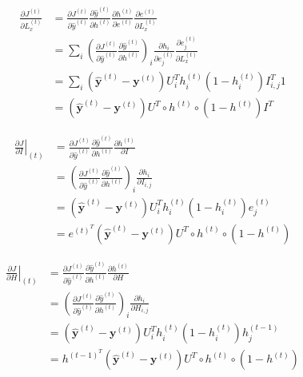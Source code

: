 \documentclass[10pt]{article}
\begin{document}
\begin{enumerate}[label=(\alph*)]
\begin{equation}
\begin{aligned}
	\frac{\partial J^{(t)}}{\partial L_x^{(t)}} & = \frac{\partial J^{(t)}}{\partial \hat{y}^{(t)}}
	\frac{\partial \hat{y}^{(t)}}{\partial h^{(t)}}\frac{\partial h^{(t)}}{\partial e^{(t)}}\frac{\partial e^{(t)}}{\partial L_x^{(t)}}\\
	& = \sum_i(\frac{\partial J^{(t)}}{\partial \hat{y}^{(t)}}\frac{\partial \hat{y}^{(t)}}{\partial h^{(t)}})_i
	\frac{\partial h_i}{\partial e^{(t)}_j}\frac{\partial e^{(t)}_j}{\partial L_x^{(t)}}\\
	& = \sum_i (\hat{\mathbf{y}}^{(t)} - \mathbf{y}^{(t)})U^{T}_ih^{(t)}_i(1-h^{(t)}_i)I^{T}_{i,j}1\\
	& = (\hat{\mathbf{y}}^{(t)} - \mathbf{y}^{(t)})U^{T}\circ h^{(t)}\circ(1-h^{(t)})I^{T}
\end{aligned}
\end{equation}

\begin{equation}
\begin{aligned}
	\left.\frac{\partial J}{\partial I}\right|_{(t)} & = \frac{\partial J^{(t)}}{\partial \hat{y}^{(t)}}
	\frac{\partial \hat{y}^{(t)}}{\partial h^{(t)}}\frac{\partial h^{(t)}}{\partial I}\\
	& = (\frac{\partial J^{(t)}}{\partial \hat{y}^{(t)}}\frac{\partial \hat{y}^{(t)}}{\partial h^{(t)}})_i\frac{\partial h_i}{\partial I_{i,j}}\\
	& = (\hat{\mathbf{y}}^{(t)} - \mathbf{y}^{(t)})U^{T}_ih^{(t)}_i(1-h^{(t)}_i)e^{(t)}_j\\
	& = e^{(t)^T}(\hat{\mathbf{y}}^{(t)} - \mathbf{y}^{(t)})U^{T}\circ h^{(t)}\circ(1-h^{(t)})
\end{aligned}
\end{equation}

\begin{equation}
\begin{aligned}
	\left.\frac{\partial J}{\partial H}\right|_{(t)} & = \frac{\partial J^{(t)}}{\partial \hat{y}^{(t)}}
	\frac{\partial \hat{y}^{(t)}}{\partial h^{(t)}}\frac{\partial h^{(t)}}{\partial H}\\
	& = (\frac{\partial J^{(t)}}{\partial \hat{y}^{(t)}}\frac{\partial \hat{y}^{(t)}}{\partial h^{(t)}})_i\frac{\partial h_i}{\partial H_{i,j}}\\
	& = (\hat{\mathbf{y}}^{(t)} - \mathbf{y}^{(t)})U^{T}_ih^{(t)}_i(1-h^{(t)}_i)h^{(t-1)}_j\\
	& = h^{(t-1)^T}(\hat{\mathbf{y}}^{(t)} - \mathbf{y}^{(t)})U^{T}\circ h^{(t)}\circ(1-h^{(t)})
\end{aligned}
\end{equation}


\end{enumerate}
\end{document}
